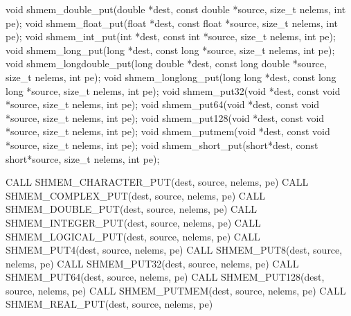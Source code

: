 \synC   %

void shmem_double_put(double *dest, const double *source, size_t nelems, int pe);
void shmem_float_put(float *dest, const float *source, size_t nelems, int pe);
void shmem_int_put(int *dest, const int *source, size_t nelems, int pe);
void shmem_long_put(long *dest, const long *source, size_t nelems, int pe);
void shmem_longdouble_put(long double *dest, const long double *source, size_t nelems, int pe);
void shmem_longlong_put(long long *dest, const long long *source, size_t nelems, int pe);
void shmem_put32(void *dest, const void *source, size_t nelems, int pe);
void shmem_put64(void *dest, const void *source, size_t nelems, int pe);
void shmem_put128(void *dest, const void *source, size_t nelems, int pe);
void shmem_putmem(void *dest, const void *source, size_t nelems, int pe);
void shmem_short_put(short*dest, const short*source, size_t nelems, int pe); %

\synF   %

CALL SHMEM_CHARACTER_PUT(dest, source, nelems, pe)
CALL SHMEM_COMPLEX_PUT(dest, source, nelems, pe)
CALL SHMEM_DOUBLE_PUT(dest, source, nelems, pe)
CALL SHMEM_INTEGER_PUT(dest, source, nelems, pe)
CALL SHMEM_LOGICAL_PUT(dest, source, nelems, pe)
CALL SHMEM_PUT4(dest, source, nelems, pe)
CALL SHMEM_PUT8(dest, source, nelems, pe)
CALL SHMEM_PUT32(dest, source, nelems, pe)
CALL SHMEM_PUT64(dest, source, nelems, pe)
CALL SHMEM_PUT128(dest, source, nelems, pe)
CALL SHMEM_PUTMEM(dest, source, nelems, pe)
CALL SHMEM_REAL_PUT(dest, source, nelems, pe) %


